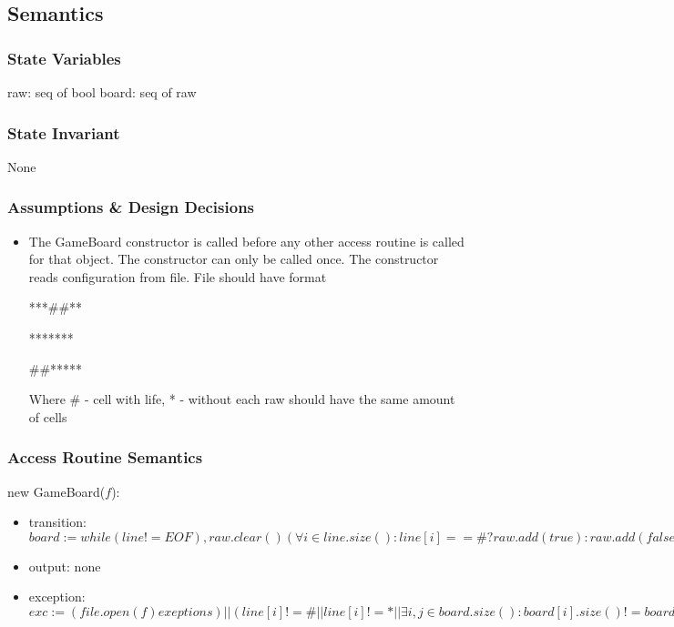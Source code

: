 \documentclass[12pt]{article}
\begin{document}
\subsection* {Semantics}

\subsubsection* {State Variables}

raw: seq of bool
board: seq of raw

\subsubsection* {State Invariant}

None

\subsubsection* {Assumptions \& Design Decisions}

\begin{itemize}
\item The GameBoard constructor is called before any
  other access routine is called for that object.  The constructor can only be
  called once. The constructor reads configuration from file. File should have format

***\#\#**

*******

\#\#*****

Where \# - cell with life, * - without each raw should have the same amount of cells
\end{itemize}

\subsubsection* {Access Routine Semantics}

new GameBoard($f$):
\begin{itemize}
\item transition: $board := while (line != EOF), raw.clear() (\forall i \in line.size(): line[i] == \# ? raw.add(true):raw.add(false)), board.add(raw)$
\item output: none
\item exception: $exc := (file.open(f) exeptions) || (line[i] != \# || line[i] != * || \exists i, j \in board.size(): board[i].size() != board[j].size()) \implies invalid\_argument$
\end{itemize}
\end{document}
